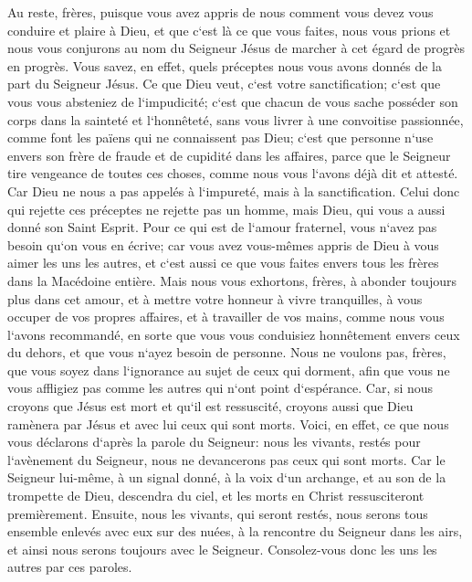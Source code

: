\verse Au reste, frères, puisque vous avez appris de nous comment vous devez vous conduire et plaire à Dieu, et que c`est là ce que vous faites, nous vous prions et nous vous conjurons au nom du Seigneur Jésus de marcher à cet égard de progrès en progrès. 
\verse Vous savez, en effet, quels préceptes nous vous avons donnés de la part du Seigneur Jésus. 
\verse Ce que Dieu veut, c`est votre sanctification; c`est que vous vous absteniez de l`impudicité; 
\verse c`est que chacun de vous sache posséder son corps dans la sainteté et l`honnêteté, 
\verse sans vous livrer à une convoitise passionnée, comme font les païens qui ne connaissent pas Dieu; 
\verse c`est que personne n`use envers son frère de fraude et de cupidité dans les affaires, parce que le Seigneur tire vengeance de toutes ces choses, comme nous vous l`avons déjà dit et attesté. 
\verse Car Dieu ne nous a pas appelés à l`impureté, mais à la sanctification. 
\verse Celui donc qui rejette ces préceptes ne rejette pas un homme, mais Dieu, qui vous a aussi donné son Saint Esprit. 
\verse Pour ce qui est de l`amour fraternel, vous n`avez pas besoin qu`on vous en écrive; car vous avez vous-mêmes appris de Dieu à vous aimer les uns les autres, 
\verse et c`est aussi ce que vous faites envers tous les frères dans la Macédoine entière. Mais nous vous exhortons, frères, à abonder toujours plus dans cet amour, 
\verse et à mettre votre honneur à vivre tranquilles, à vous occuper de vos propres affaires, et à travailler de vos mains, comme nous vous l`avons recommandé, 
\verse en sorte que vous vous conduisiez honnêtement envers ceux du dehors, et que vous n`ayez besoin de personne. 
\verse Nous ne voulons pas, frères, que vous soyez dans l`ignorance au sujet de ceux qui dorment, afin que vous ne vous affligiez pas comme les autres qui n`ont point d`espérance. 
\verse Car, si nous croyons que Jésus est mort et qu`il est ressuscité, croyons aussi que Dieu ramènera par Jésus et avec lui ceux qui sont morts. 
\verse Voici, en effet, ce que nous vous déclarons d`après la parole du Seigneur: nous les vivants, restés pour l`avènement du Seigneur, nous ne devancerons pas ceux qui sont morts. 
\verse Car le Seigneur lui-même, à un signal donné, à la voix d`un archange, et au son de la trompette de Dieu, descendra du ciel, et les morts en Christ ressusciteront premièrement. 
\verse Ensuite, nous les vivants, qui seront restés, nous serons tous ensemble enlevés avec eux sur des nuées, à la rencontre du Seigneur dans les airs, et ainsi nous serons toujours avec le Seigneur. 
\verse Consolez-vous donc les uns les autres par ces paroles. 

